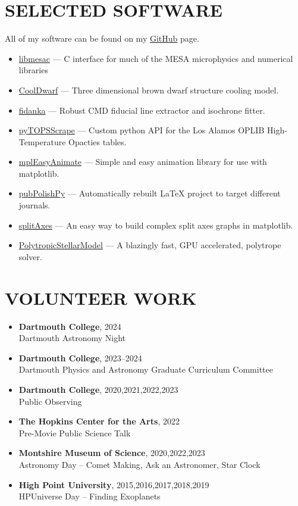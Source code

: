 \documentclass[margin, 10pt]{res} %
\begin{document}
\begin{resume}
\section{SELECTED SOFTWARE}
All of my software can be found on my \href{https://github.com/tboudreaux}{GitHub} page.
\begin{itemize}
  \item \href{https://github.com/4D-STAR/libmesac}{libmesac} --- C interface for much of the MESA microphysics and numerical libraries
	\item \href{https://github.com/tboudreaux/CoolDwarf}{CoolDwarf} --- Three dimensional brown dwarf structure cooling model.
	\item \href{https://github.com/tboudreaux/fidanka}{fidanka} --- Robust CMD fiducial line extractor and isochrone fitter.
	\item \href{https://github.com/tboudreaux/pytopsscrape}{pyTOPSScrape} --- Custom python API for the Los Alamos OPLIB High-Temperature Opacties tables.
	\item \href{https://github.com/tboudreaux/mpl_animate}{mplEasyAnimate} --- Simple and easy animation library for use with matplotlib.
	\item \href{https://github.com/tboudreaux/PubPolishPy}{pubPolishPy} --- Automatically rebuilt LaTeX project to target different journals.
	\item \href{https://github.com/tboudreaux/splitAxes}{splitAxes} --- An easy way to build complex split axes graphs in matplotlib.
	\item \href{https://github.com/tboudreaux/PolytropicStellarModel}{PolytropicStellarModel} --- A blazingly fast, GPU accelerated, polytrope solver.
\end{itemize}

\section{VOLUNTEER WORK}
\begin{itemize}
	\item {\scriptsize \textbf{Dartmouth College}}, {\small 2024} \\ Dartmouth Astronomy Night
	\item {\scriptsize \textbf{Dartmouth College}}, {\small 2023--2024} \\ Dartmouth Physics and Astronomy Graduate Curriculum Committee 
	\item {\scriptsize \textbf{Dartmouth College}}, {\small 2020,2021,2022,2023} \\ Public Observing
	\item {\scriptsize \textbf{The Hopkins Center for the Arts}}, {\small 2022} \\ Pre-Movie Public Science Talk
	\item {\scriptsize \textbf{Montshire Museum of Science}}, {\small 2020,2022,2023} \\ Astronomy Day -- Comet Making, Ask an Astronomer, Star Clock
	\item {\scriptsize \textbf{High Point University}}, {\small 2015,2016,2017,2018,2019} \\ HPUniverse Day -- Finding Exoplanets
\end{itemize}


\end{resume}
\end{document}
